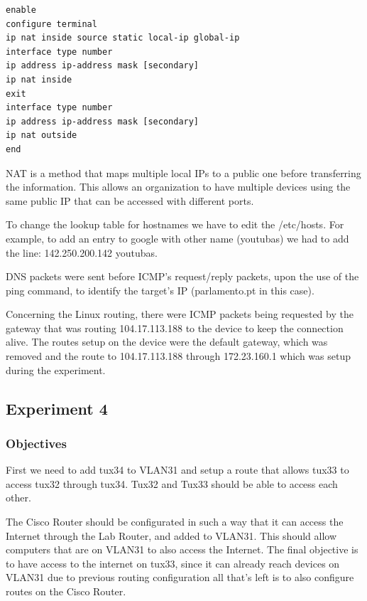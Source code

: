 \documentclass[a4paper,11pt,english]{article}
\begin{document}
\begin{lstlisting}
enable
configure terminal
ip nat inside source static local-ip global-ip
interface type number
ip address ip-address mask [secondary]
ip nat inside
exit
interface type number
ip address ip-address mask [secondary]
ip nat outside
end
\end{lstlisting}

            NAT is a method that maps multiple local IPs to a public one before transferring the information.
            This allows an organization to have multiple devices using the same public IP that can be
            accessed with different ports.

            To change the lookup table for hostnames we have to edit the /etc/hosts. For example, to add
            an entry to google with other name (youtubas) we had to add the line: 142.250.200.142 youtubas.

            DNS packets were sent before ICMP's request/reply packets, upon the use of the ping
            command, to identify the target's IP (parlamento.pt in this case).

            Concerning the Linux routing, there were ICMP packets being requested by the gateway that was routing 
            104.17.113.188 to the device to keep the connection alive. The routes setup on the device were the
            default gateway, which was removed and the route to 104.17.113.188 through 172.23.160.1 which was setup
            during the experiment.




    \subsection{Experiment 4}
        \subsubsection{Objectives}
            First we need to add tux34 to VLAN31 and setup a route that allows
            tux33 to access tux32 through tux34. Tux32 and Tux33 should be able to access
            each other.

            The Cisco Router should be configurated in such a way that it can access 
            the Internet through the Lab Router, and added to VLAN31. This should
            allow computers that are on VLAN31 to also access the Internet.
            The final objective is to have access to the internet on tux33, since it
            can already reach devices on VLAN31 due to previous routing configuration
            all that's left is to also configure routes on the Cisco Router.
\end{document}

